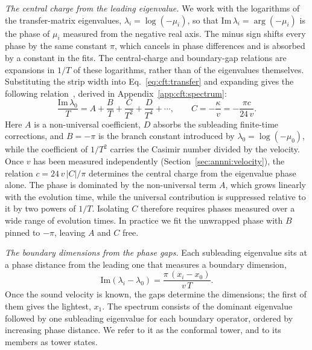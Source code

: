 \textit{The central charge from the leading eigenvalue.} We work with the logarithms of the transfer-matrix eigenvalues, $\lambda_i = \log(-\mu_i)$, so that $\mathrm{Im}\,\lambda_i = \arg(-\mu_i)$ is the phase of $\mu_i$ measured from the negative real axis. The minus sign shifts every phase by the same constant $\pi$, which cancels in phase differences and is absorbed by a constant in the fits. The central-charge and boundary-gap relations are expansions in $1/T$ of these logarithms, rather than of the eigenvalues themselves. Substituting the strip width into Eq.~\eqref{eq:cft:transfer} and expanding gives the following relation~\cite{carignano_tagliacozzo2025}, derived in Appendix~\ref{app:cft:spectrum}:
\begin{equation}
  \frac{\mathrm{Im}\,\lambda_0}{T} = A + \frac{B}{T} + \frac{C}{T^2} + \frac{D}{T^4} + \cdots,
  \qquad C = -\frac{\kappa}{v} = -\frac{\pi c}{24\,v}.
  \label{eq:cft:eq3}
\end{equation}
Here $A$ is a non-universal coefficient, $D$ absorbs the subleading finite-time corrections, and $B=-\pi$ is the branch constant introduced by $\lambda_0=\log(-\mu_0)$, while the coefficient of $1/T^2$ carries the Casimir number divided by the velocity. Once $v$ has been measured independently (Section~\ref{sec:annni:velocity}), the relation $c = 24\,v\,|C|/\pi$ determines the central charge from the eigenvalue phase alone. The phase is dominated by the non-universal term $A$, which grows linearly with the evolution time, while the universal contribution is suppressed relative to it by two powers of $1/T$. Isolating $C$ therefore requires phases measured over a wide range of evolution times. In practice we fit the unwrapped phase with $B$ pinned to $-\pi$, leaving $A$ and $C$ free.

\textit{The boundary dimensions from the phase gaps.} Each subleading eigenvalue sits at a phase distance from the leading one that measures a boundary dimension,
\begin{equation}
  \mathrm{Im}(\lambda_i-\lambda_0) = \frac{\pi\,(x_i-x_0)}{v\,T}.
  \label{eq:cft:eq4}
\end{equation}
Once the sound velocity is known, the gaps determine the dimensions; the first of them gives the lightest, $x_1$. The spectrum consists of the dominant eigenvalue followed by one subleading eigenvalue for each boundary operator, ordered by increasing phase distance. We refer to it as the conformal tower, and to its members as tower states.


